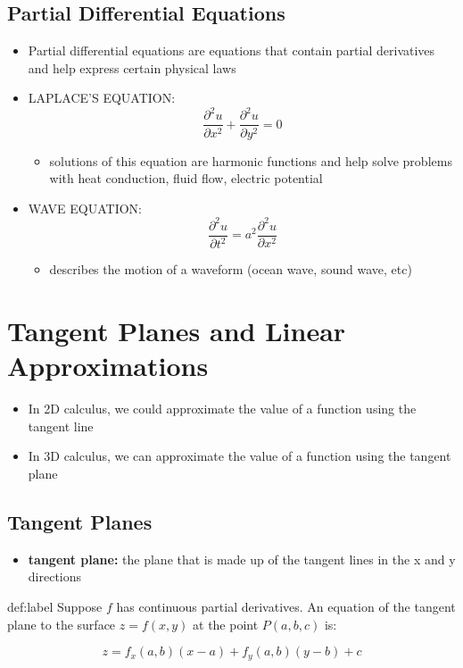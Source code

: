 \documentclass{package/notes}
\begin{document}
\subsection{Partial Differential Equations}

\begin{itemize}
	\item Partial differential equations are equations that contain partial derivatives and help express certain physical laws
	\item LAPLACE'S EQUATION: $$\frac{\partial^2u}{\partial x^2} + \frac{\partial^2u}{\partial y^2} = 0$$
	\begin{itemize}
		\item solutions of this equation are harmonic functions and help solve problems with heat conduction, fluid flow, electric potential
	\end{itemize}
	\item WAVE EQUATION: $$\frac{\partial^2u}{\partial t^2} = a^2\frac{\partial^2u}{\partial x^2}$$
	\begin{itemize}
		\item describes the motion of a waveform (ocean wave, sound wave, etc)
	\end{itemize}
\end{itemize}


\section{Tangent Planes and Linear Approximations}

\begin{itemize}
	\item In 2D calculus, we could approximate the value of a function using the tangent line
	\item In 3D calculus, we can approximate the value of a function using the tangent plane
\end{itemize}

\subsection{Tangent Planes}

\begin{itemize}
	\item \textbf{tangent plane:} the plane that is made up of the tangent lines in the x and y directions
\end{itemize}

\begin{definition}{def:label}
	Suppose $f$ has continuous partial derivatives. An equation of the tangent plane to the surface $z = f(x,y)$ at the point $P(a,b,c)$ is:

	$$z = f_x(a,b)(x-a)+f_y(a,b)(y-b)+c$$
\end{definition}
\end{document}
